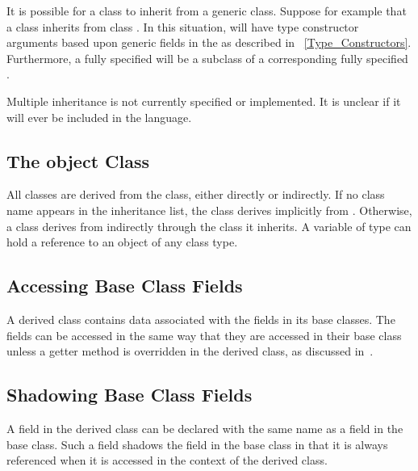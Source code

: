 It is possible for a class to inherit from a generic class. Suppose for
example that a class  inherits from class . In this
situation,  will have type constructor arguments based upon
generic fields in the  as described in
~\ref{Type_Constructors}. Furthermore, a fully specified  will be
a subclass of a corresponding fully specified .

\begin{future}
Multiple inheritance is not currently specified or implemented.
It is unclear if it will ever be included in the language.
\end{future}

\subsection{The object Class}
\label{The_object_Class}

All classes are derived from the  class, either directly or
indirectly.  If no class name appears in the inheritance list, the class derives
implicitly from .  Otherwise, a class derives from 
indirectly through the class it inherits.  A variable of type 
can hold a reference to an object of any class type.

\subsection{Accessing Base Class Fields}
\label{Accessing_Base_Class_Fields}

A derived class contains data associated with the fields in its base
classes.  The fields can be accessed in the same way that they are
accessed in their base class unless a getter method is
overridden in the derived class, as discussed
in~.

\subsection{Shadowing Base Class Fields}
\label{Shadowing_Base_Class_Fields}
A field in the derived class can be declared with the same name as a
field in the base class.  Such a field shadows the field in the base
class in that it is always referenced when it is accessed in the
context of the derived class.

